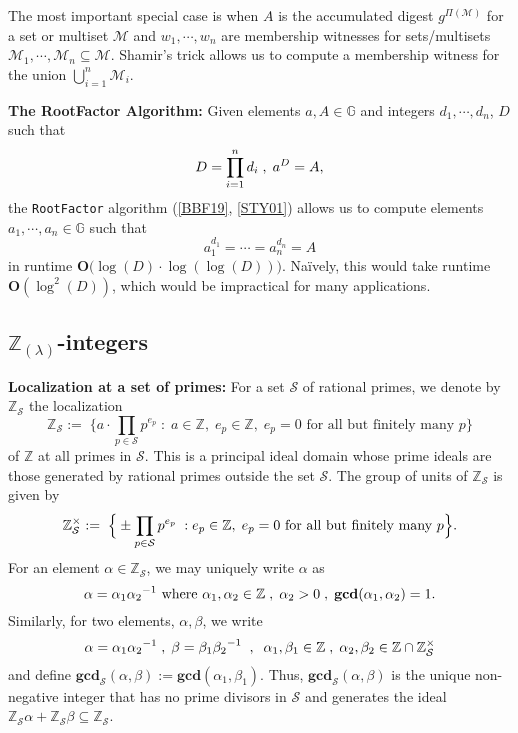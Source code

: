 \documentclass[11pt, lettersize, notitlepage, leqno, footskip=0.6cm]{article}
\newcommand{\bz}{\mathbb Z}
\newcommand{\pl}{\prod\limits}
\newcommand{\slim}{\sum\limits}
\newcommand{\bG}{\mathbb{G}}
\newcommand{\mc}{\mathcal}
\newcommand{\mb}{\mathbb}
\newcommand{\mbf}{\mathbf}
\newcommand{\al}{\alpha}
\newcommand{\be}{\beta}
\newcommand{\lamb}{\lambda}
\newcommand{\bzs}{\bz_{\mc{S}}}
\newcommand{\sub}{\subseteq}
\newcommand{\vs}{\vspace{-0.15cm}}
\newcommand{\noin}{\noindent}
\newcommand{\op}{overwhelming probability}
\newcommand{\LCM}{\mbf{lcm}}
\newcommand{\GCD}{\mbf{gcd}}
\numberwithin{equation}{section}
\begin{document}
The most important special case is when $A$ is the accumulated digest $g^{\Pi(\mc{M})}$ for a set or multiset $\mc{M}$ and $w_1,\cdots,w_n$ are membership witnesses for sets/multisets $\mc{M}_1,\cdots,\mc{M}_n\sub \mc{M}$. Shamir's trick allows us to compute a membership witness for the union $\bigcup\limits_{i=1}^n \mc{M}_i$. 

\begin{comment} Conversely, for any element $b = \pl_{i=1}^n a_i^{x_i}$ $(x_i\in\bz)$, we have \vs $$ b^{\LCM(d_1,\cdots,d_n)} = A^{\slim_{i=1}^n  \frac{\LCM(d_1,\cdots,d_n)x_i}{d_i}} $$ and the low order assumption implies that with \op, \vs $$b =  a^{\slim_{i=1}^n  \frac{\LCM(d_1,\cdots,d_n)x_i}{d_i}}.$$ Thus, $b$ is expressible as a power of $a$. 

\end{comment}

\vspace{0.2cm}


\noin \textbf{The RootFactor Algorithm:} Given elements $a, A\in\mb{G}$ and integers $d_1,\cdots, d_n$, $D$ such that \vs $$D= \pl_{i=1}^n d_i\; ,\; a^{D} = A,\vs $$ the {\tt{RootFactor}} algorithm (\hyperlink{BBF19}{[BBF19]}, \hyperlink{STY01}{[STY01]}) allows us to compute elements $a_1,\cdots, a_n\in \bG$ such that \vs $$a_1^{d_1}=\cdots = a_n^{d_n} = A$$ in runtime $\mbf{O}\big(\log(D)\cdot \log(\log(D))\big)$. Na\"ively, this would take runtime $\mbf{O}(\log^2(D))$, which would be impractical for many applications.


\subsection{\fontsize{11}{11}\selectfont $\bz_{(\lamb)}$-integers}


\noin \textbf{Localization at a set of primes:} For a set $\mc{S}$ of rational primes, we denote by $\bz_{\mc{S}}$ the localization \vs $$\bz_{\mc{S}}:= \;\Big\{a\cdot\pl_{p\in \mc{S}} p^{e_p}\;:\;a\in\bz,\; e_p\in \bz,\;e_p = 0 \text{ for all but finitely many } p\Big\} $$ of $\bz$ at all primes in $\mc{S}$. This is a principal ideal domain whose prime ideals are those generated by rational primes outside the set $\mc{S}$. The group of units of $\bzs$ is given by \vs $$\bzs^{\times}:= \;\Big\{\pm {\pl_{p\in \mc{S}} p^{e_p}}\;: e_p\in \bz,\;e_p = 0 \text{ for all but finitely many } p\Big\} . \vs $$ For an element $\al\in \bz_{\mc{S}}$, we may uniquely write $\al$ as \vs $$\al = {\al_1}{\al_2}^{-1} \text{ where } \al_1,\al_2\in \bz\;,\; \al_2>0\;,\;\GCD(\al_1,\al_2) = 1.\vs $$ Similarly, for two elements, $\al,\be$, we write \vs $$\al = \al_1{\al_2}^{-1}\;,\; \be = {\be_1}{\be_2}^{-1}\;\;,\;\;\al_1,\be_1\in\bz\;,\;\al_2,\be_2\in \bz\cap\bzs^{\times} \vs $$ and define $\GCD_{\mc{S}}(\al,\be):= \GCD(\al_1,\be_1)$. Thus, $\GCD_{\mc{S}}(\al,\be)$ is the unique non-negative integer that has no prime divisors in $\mc{S}$ and generates the ideal $\bzs \al+\bzs\be\sub \bzs$.\vspace{0.15cm}
\end{document}
